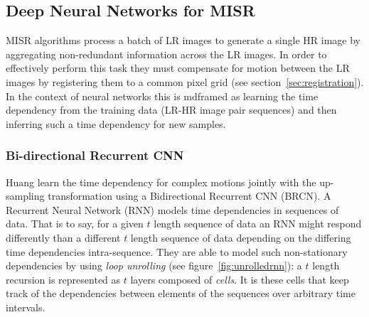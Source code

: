 \subsection{Deep Neural Networks for MISR}
MISR algorithms process a batch of LR images to generate a single HR image by aggregating non-redundant information across the LR images.
%
In order to effectively perform this task they must compensate for motion between the LR images by registering them to a common pixel grid (see section~\ref{sec:registration}).
%
In the context of neural networks this is mdframed as learning the time dependency from the training data (LR-HR image pair sequences) and then inferring such a time dependency for new samples.
%



\subsubsection{Bi-directional Recurrent CNN}





Huang \etal \cite{huang2015bidirectional} learn the time dependency for complex motions jointly with the up-sampling transformation using a Bidirectional Recurrent CNN (BRCN). 
%
A Recurrent Neural Network (RNN) models time dependencies in sequences of data.
%
That is to say, for a given \(t\) length sequence of data an RNN might respond differently than a different \(t\) length sequence of data depending on the differing time dependencies intra-sequence.
%
They are able to model such non-stationary dependencies by using \textit{loop unrolling} (see figure~\ref{fig:unrolledrnn}): a \(t\) length recursion is represented as \(t\) layers composed of \textit{cells}.
%
It is these cells that keep track of the dependencies between elements of the sequences over arbitrary time intervals.
%
%

